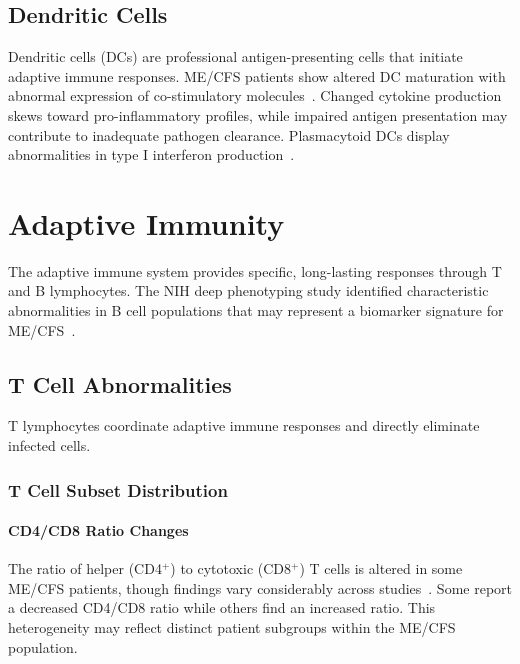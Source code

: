 \subsection{Dendritic Cells}
\label{sec:dendritic-cells}

Dendritic cells (DCs) are professional antigen-presenting cells that initiate adaptive immune responses. ME/CFS patients show altered DC maturation with abnormal expression of co-stimulatory molecules~\cite{EatonFitch2019}. Changed cytokine production skews toward pro-inflammatory profiles, while impaired antigen presentation may contribute to inadequate pathogen clearance. Plasmacytoid DCs display abnormalities in type I interferon production~\cite{EatonFitch2019}.

\section{Adaptive Immunity}
\label{sec:adaptive-immunity}

The adaptive immune system provides specific, long-lasting responses through T and B lymphocytes. The NIH deep phenotyping study identified characteristic abnormalities in B cell populations that may represent a biomarker signature for ME/CFS~\cite{walitt2024deep}.

\subsection{T Cell Abnormalities}
\label{sec:t-cells}

T lymphocytes coordinate adaptive immune responses and directly eliminate infected cells.

\subsubsection{T Cell Subset Distribution}

\paragraph{CD4/CD8 Ratio Changes}
The ratio of helper (CD4$^{+}$) to cytotoxic (CD8$^{+}$) T cells is altered in some ME/CFS patients, though findings vary considerably across studies~\cite{EatonFitch2019}. Some report a decreased CD4/CD8 ratio while others find an increased ratio. This heterogeneity may reflect distinct patient subgroups within the ME/CFS population.

